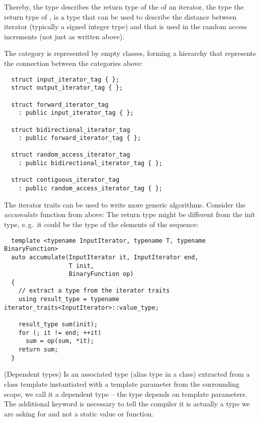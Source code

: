 Thereby, the type  describes the return type of the  of an iterator, the type  the return type of
,  is a type that can be used to describe the distance between iterator (typically a signed integer type)
and that is used in the random access increments (not just  as written above).

The category is represented by empty classes, forming a hierarchy that represents the connection between the categories above:
\begin{verbatim}
  struct input_iterator_tag { };
  struct output_iterator_tag { };

  struct forward_iterator_tag
    : public input_iterator_tag { };

  struct bidirectional_iterator_tag
    : public forward_iterator_tag { };

  struct random_access_iterator_tag
    : public bidirectional_iterator_tag { };

  struct contiguous_iterator_tag
    : public random_access_iterator_tag { };
\end{verbatim}

\begin{example}
  The iterator traits can be used to write more generic algorithms. Consider the \emph{accumulate} function from above:
  The return type might be different from the init type, e.\,g.\ it could be the type of the elements of the sequence:
  \begin{verbatim}
  template <typename InputIterator, typename T, typename BinaryFunction>
  auto accumulate(InputIterator it, InputIterator end,
                  T init,
                  BinaryFunction op)
  {
    // extract a type from the iterator traits
    using result_type = typename iterator_traits<InputIterator>::value_type;

    result_type sum(init);
    for (; it != end; ++it)
      sum = op(sum, *it);
    return sum;
  }
  \end{verbatim}
\end{example}

\begin{rem}(Dependent types)
  Is an associated type (alias type in a class) extracted from a class template instantiated with a template parameter from the surrounding scope,
  we call it a dependent type -- the type depends on template parameters. The additional keyword  is necessary to tell the compiler
  it is actually a type we are asking for and not a static value or function.
\end{rem}

